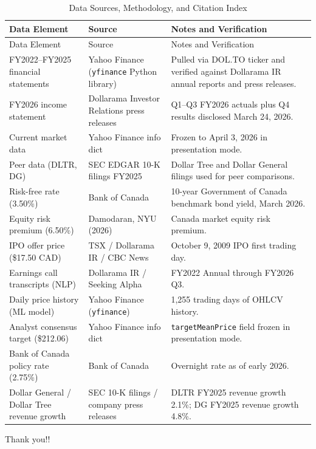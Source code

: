 \documentclass[11pt]{article}
\begin{document}
\clearpage
\begingroup
\small
\setlength{\tabcolsep}{4pt}
\setlength{\LTleft}{0pt}
\setlength{\LTright}{0pt}
\begin{longtable}{P{4.0cm} P{4.0cm} P{7.0cm}}
\caption{Data Sources, Methodology, and Citation Index}\\
\toprule
{}
Data Element & Source & Notes and Verification \\
\midrule
\endfirsthead
\toprule
{}
Data Element & Source & Notes and Verification \\
\midrule
\endhead
FY2022--FY2025 financial statements & Yahoo Finance (\texttt{yfinance} Python library) & Pulled via DOL.TO ticker and verified against Dollarama IR annual reports and press releases. \\
FY2026 income statement & Dollarama Investor Relations press releases & Q1--Q3 FY2026 actuals plus Q4 results disclosed March 24, 2026. \\
Current market data & Yahoo Finance info dict & Frozen to April 3, 2026 in presentation mode. \\
Peer data (DLTR, DG) & SEC EDGAR 10-K filings FY2025 & Dollar Tree and Dollar General filings used for peer comparisons. \\
Risk-free rate (3.50\%) & Bank of Canada & 10-year Government of Canada benchmark bond yield, March 2026. \\
Equity risk premium (6.50\%) & Damodaran, NYU (2026) & Canada market equity risk premium. \\
IPO offer price (\$17.50 CAD) & TSX / Dollarama IR / CBC News & October 9, 2009 IPO first trading day. \\
Earnings call transcripts (NLP) & Dollarama IR / Seeking Alpha & FY2022 Annual through FY2026 Q3. \\
Daily price history (ML model) & Yahoo Finance (\texttt{yfinance}) & 1,255 trading days of OHLCV history. \\
Analyst consensus target (\$212.06) & Yahoo Finance info dict & \texttt{targetMeanPrice} field frozen in presentation mode. \\
Bank of Canada policy rate (2.75\%) & Bank of Canada & Overnight rate as of early 2026. \\
Dollar General / Dollar Tree revenue growth & SEC 10-K filings / company press releases & DLTR FY2025 revenue growth 2.1\%; DG FY2025 revenue growth 4.8\%. \\
\bottomrule
\end{longtable}
\endgroup

Thank you!!
\end{document}
